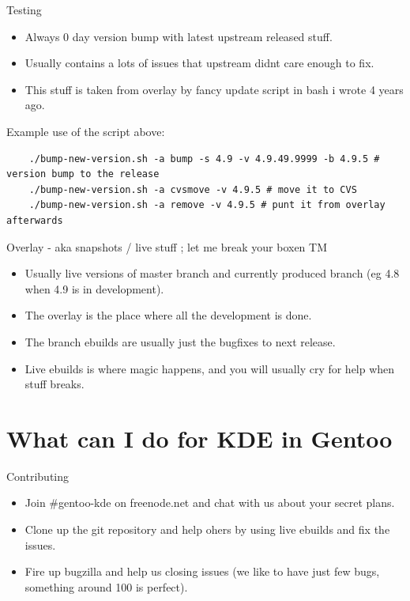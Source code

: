 \documentclass{beamer}
\begin{document}
\begin{frame}{Testing}
	\begin{itemize}
		\item Always 0 day version bump with latest upstream released stuff.
		\item Usually contains a lots of issues that upstream didnt care enough to fix.
		\item This stuff is taken from overlay by fancy update script in bash i wrote 4 years ago.
	\end{itemize}
	Example use of the script above:
	\begin{verbatim}
	./bump-new-version.sh -a bump -s 4.9 -v 4.9.49.9999 -b 4.9.5 # version bump to the release
	./bump-new-version.sh -a cvsmove -v 4.9.5 # move it to CVS
	./bump-new-version.sh -a remove -v 4.9.5 # punt it from overlay afterwards
	\end{verbatim}
\end{frame}

\begin{frame}{Overlay - aka snapshots / live stuff ; let me break your boxen TM}
	\begin{itemize}
		\item Usually live versions of master branch and currently produced branch (eg 4.8 when 4.9 is in development).
		\item The overlay is the place where all the development is done.
		\item The branch ebuilds are usually just the bugfixes to next release.
		\item Live ebuilds is where magic happens, and you will usually cry for help when stuff breaks.
	\end{itemize}
\end{frame}

\section{What can I do for KDE in Gentoo}

\begin{frame}{Contributing}
	\begin{itemize}
		\item Join #gentoo-kde on freenode.net and chat with us about your secret plans.
		\item Clone up the git repository and help ohers by using live ebuilds and fix the issues.
		\item Fire up bugzilla and help us closing issues (we like to have just few bugs, something around 100 is perfect).
	\end{itemize}
\end{frame}
\end{document}
